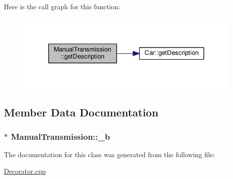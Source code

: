 Here is the call graph for this function\+:
\nopagebreak
\begin{figure}[H]
\begin{center}
\leavevmode
\includegraphics[width=324pt]{classManualTransmission_a3c5f0113936e6f8734a659ab8331a565_cgraph}
\end{center}
\end{figure}




\subsection{Member Data Documentation}
\subsubsection[{\texorpdfstring{\+\_\+b}{_b}}]{$\ast$ Manual\+Transmission\+::\+\_\+b\hspace{0.3cm}{\ttfamily [private]}}\hypertarget{classManualTransmission_ac32c597fb255d5ce8faeaf7d4a8525c2}{}\label{classManualTransmission_ac32c597fb255d5ce8faeaf7d4a8525c2}


The documentation for this class was generated from the following file\+:\begin{DoxyCompactItemize}
\item 
\hyperlink{Decorator_8cpp}{Decorator.\+cpp}\end{DoxyCompactItemize}
